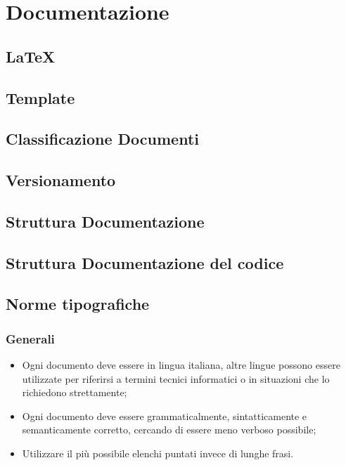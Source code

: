 \section{Documentazione}
\subsection{LaTeX}
\subsection{Template}
\subsection{Classificazione Documenti}
\subsection{Versionamento}
\subsection{Struttura Documentazione}
\subsection{Struttura Documentazione del codice}
\subsection{Norme tipografiche}
\subsubsection{Generali}
\begin{itemize}
\item Ogni documento deve essere in lingua italiana, altre lingue possono essere utilizzate per riferirsi a termini tecnici informatici o in situazioni che lo richiedono strettamente;

\item Ogni documento deve essere grammaticalmente, sintatticamente e semanticamente corretto, cercando di essere meno verboso possibile;

\item Utilizzare il più possibile elenchi puntati invece di lunghe frasi.

\end{itemize}
